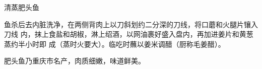\begin{recipe}{清蒸肥头鱼}

\ingredients


\preparation

鱼杀后去内脏洗净，在两侧背肉上以刀斜划约二分深的刀线，将口蘑和火腿片镶入刀线
内，抹上食盐和胡椒，淋上绍酒，以网油裹好盛入盘内，再加进姜片和黄葱蒸约半小时即
成（蒸时火要大）。临吃时蘸以姜米调醋（厨称毛姜醋）。

\features

肥头鱼乃重庆市名产，肉质细嫩，味道鲜美。

\end{recipe}

